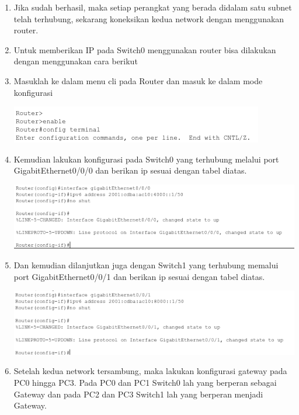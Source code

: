 \documentclass{article}
\begin{document}
\begin{flushleft}
\begin{enumerate}
            \item Jika sudah berhasil, maka setiap perangkat yang berada didalam satu subnet telah terhubung, sekarang koneksikan kedua network dengan menggunakan router.
            
            \item Untuk memberikan IP pada Switch0 menggunakan router bisa dilakukan dengan menggunakan cara berikut
            \item Masuklah ke dalam menu cli pada Router dan masuk ke dalam mode konfigurasi

            \includegraphics[]{3-5.png}

            \item Kemudian lakukan konfigurasi pada Switch0 yang terhubung melalui port GigabitEthernet0/0/0 dan berikan ip sesuai dengan tabel diatas.
            
            \includegraphics[scale=0.65]{3-6.png}

            \item Dan kemudian dilanjutkan juga dengan Switch1 yang terhubung memalui port GigabitEthernet0/0/1 dan berikan ip sesuai dengan tabel diatas.
            
            \includegraphics[scale=0.65]{3-7.png}

            \item Setelah kedua network tersambung, maka lakukan konfigurasi gateway pada PC0 hingga PC3. Pada PC0 dan PC1 Switch0 lah yang berperan sebagai Gateway dan pada PC2 dan PC3 Switch1 lah yang berperan menjadi Gateway.
            

\end{enumerate}
\end{flushleft}
\end{document}
